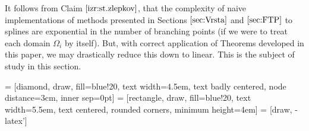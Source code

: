 \documentclass{article}
\begin{document}
It follows from Claim $\ref{izr:st.zlepkov}$, that the complexity of naive implementations of methods presented in Sections $\ref{sec:Vrsta}$ and $\ref{sec:FTP}$ to splines are exponential in the number of branching points (if we were to treat each domain $\Omega_i$ by itself). But, with correct application of Theorems developed in this paper, we may drastically reduce this down to linear. This is the subject of study in this section.
\vspace{10px}

 = [diamond, draw, fill=blue!20, 
    text width=4.5em, text badly centered, node distance=3cm, inner sep=0pt]
 = [rectangle, draw, fill=blue!20, 
    text width=5.5em, text centered, rounded corners, minimum height=4em]
 = [draw, -latex']
\end{document}
